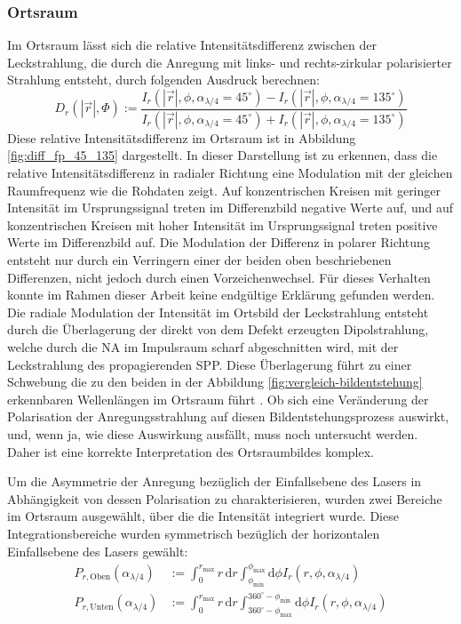 \documentclass[a4paper, titlepage,  ngerman, fullpage]{book}
\begin{document}
		\subsubsection{Ortsraum}
		Im Ortsraum lässt sich die relative Intensitätsdifferenz zwischen der Leckstrahlung, die durch die Anregung mit links- und rechts-zirkular polarisierter Strahlung entsteht, durch folgenden Ausdruck berechnen:
		\begin{equation}
		 	\label{eq:diff_measure}
			D_r\left(|\vec{r}|, \Phi\right) := \dfrac{I_r(|\vec{r}|, \phi, \alpha_{\lambda /4} = 45^\circ) - I_r(|\vec{r}|, \phi, \alpha_{\lambda /4} = 135^\circ)}{I_r(|\vec{r}|, \phi, \alpha_{\lambda /4} = 45^\circ) + I_r(|\vec{r}|, \phi, \alpha_{\lambda /4} = 135^\circ)}
		\end{equation} 
		 Diese relative Intensitätsdifferenz im Ortsraum ist in Abbildung \ref{fig:diff_fp_45_135} dargestellt. In dieser Darstellung ist zu erkennen, dass die relative Intensitätsdifferenz in radialer Richtung eine Modulation mit der gleichen Raumfrequenz wie die Rohdaten zeigt. Auf konzentrischen Kreisen mit geringer Intensität im Ursprungssignal treten im Differenzbild negative Werte auf, und auf konzentrischen Kreisen mit hoher Intensität im Ursprungssignal treten positive Werte im Differenzbild auf. Die Modulation der Differenz in polarer Richtung entsteht nur durch ein Verringern einer der beiden oben beschriebenen Differenzen, nicht jedoch durch einen Vorzeichenwechsel. Für dieses Verhalten konnte im Rahmen dieser Arbeit keine endgültige Erklärung gefunden werden. Die radiale Modulation der Intensität im Ortsbild der Leckstrahlung entsteht durch die Überlagerung der direkt von dem Defekt erzeugten Dipolstrahlung, welche durch die NA im Impulsraum scharf abgeschnitten wird, mit der Leckstrahlung des propagierenden SPP. Diese Überlagerung führt zu einer Schwebung die zu den beiden in der Abbildung \ref{fig:vergleich-bildentstehung} erkennbaren Wellenlängen im Ortsraum führt \cite{Hohenau.2011}. Ob sich eine Veränderung der Polarisation der Anregungsstrahlung auf diesen Bildentstehungsprozess auswirkt, und, wenn ja, wie diese Auswirkung ausfällt, muss noch untersucht werden. Daher ist eine korrekte Interpretation des Ortsraumbildes komplex. 
		 
		 Um die Asymmetrie der Anregung bezüglich der Einfallsebene des Lasers in Abhängigkeit von dessen Polarisation zu charakterisieren, wurden zwei Bereiche im Ortsraum ausgewählt, über die die Intensität integriert wurde. Diese Integrationsbereiche wurden symmetrisch bezüglich der horizontalen Einfallsebene des Lasers gewählt:		 
		 \begin{align}
		 	P_{r, \mathrm{Oben}}(\alpha_{\lambda/4}) &:= \int_{0}^{r_\mathrm{max}}r \, \mathrm{d}r \int_{\phi_\mathrm{min}}^{\phi_\mathrm{max}} \mathrm{d}\phi I_r(r, \phi, \alpha_{\lambda /4}) \\
		 	\nonumber
		 	P_{r, \mathrm{Unten}}(\alpha_{\lambda/4}) &:= \int_{0}^{r_\mathrm{max}}r \, \mathrm{d}r \int_{360^\circ -\phi_\mathrm{max}}^{360^\circ - \phi_\mathrm{min}} \mathrm{d}\phi I_r(r, \phi, \alpha_{\lambda/4})		 	
		 \end{align}
	 
\end{document}
